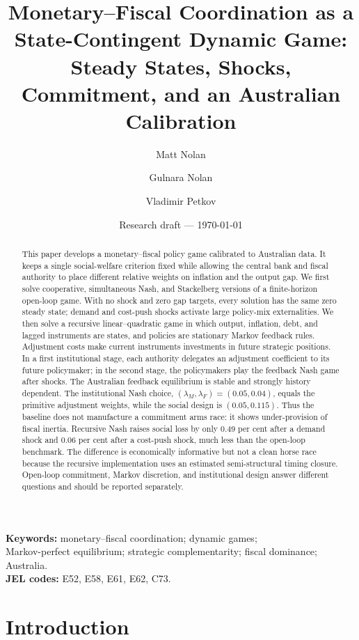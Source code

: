 \documentclass[11pt]{article}
\title{Monetary--Fiscal Coordination as a State-Contingent Dynamic Game:\\
Steady States, Shocks, Commitment, and an Australian Calibration}
\author{Matt Nolan \and Gulnara Nolan \and Vladimir Petkov}
\date{Research draft --- \today}
\begin{document}
\maketitle

\begin{abstract}
This paper develops a monetary--fiscal policy game calibrated to Australian
data.  It keeps a single social-welfare criterion fixed while allowing the
central bank and fiscal authority to place different relative weights on
inflation and the output gap.  We first solve cooperative, simultaneous Nash,
and Stackelberg versions of a finite-horizon open-loop game.  With no shock and
zero gap targets, every solution has the same zero steady state; demand and
cost-push shocks activate large policy-mix externalities.  We then solve a
recursive linear--quadratic game in which output, inflation, debt, and lagged
instruments are states, and policies are stationary Markov feedback rules.
Adjustment costs make current instruments investments in future strategic
positions.  In a first institutional stage, each authority delegates an
adjustment coefficient to its future policymaker; in the second stage, the
policymakers play the feedback Nash game after shocks.  The Australian feedback
equilibrium is stable and strongly history dependent.  The institutional Nash
choice, $(\lambda_M,\lambda_F)=(0.05,0.04)$, equals the primitive adjustment
weights, while the social design is $(0.05,0.115)$.  Thus the baseline does not
manufacture a commitment arms race: it shows under-provision of fiscal inertia.
Recursive Nash raises social loss by only 0.49 per cent after a demand shock and
0.06 per cent after a cost-push shock, much less than the open-loop benchmark.
The difference is economically informative but not a clean horse race because
the recursive implementation uses an estimated semi-structural timing closure.
Open-loop commitment, Markov discretion, and institutional design answer
different questions and should be reported separately.
\end{abstract}

\noindent\textbf{Keywords:} monetary--fiscal coordination; dynamic games;\\
Markov-perfect equilibrium; strategic complementarity; fiscal dominance;
Australia.\\
\textbf{JEL codes:} E52, E58, E61, E62, C73.

\section{Introduction}
\end{document}

